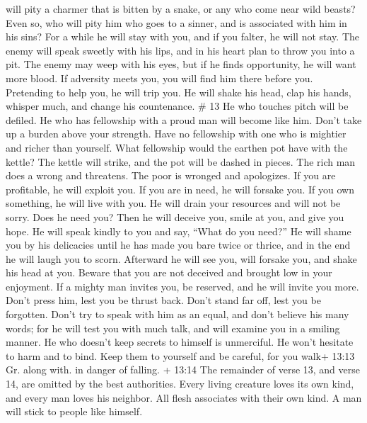 will pity a charmer that is bitten by a snake, or any who come near wild
beasts?  Even so, who will pity him who goes to a sinner,
and is associated with him in his sins?  For a while he
will stay with you, and if you falter, he will not stay. 
The enemy will speak sweetly with his lips, and in his heart plan to
throw you into a pit. The enemy may weep with his eyes, but if he finds
opportunity, he will want more blood.  If adversity meets
you, you will find him there before you. Pretending to help you, he will
trip you.  He will shake his head, clap his hands, whisper
much, and change his countenance. \# 13  He who touches
pitch will be defiled. He who has fellowship with a proud man will
become like him.  Don't take up a burden above your
strength. Have no fellowship with one who is mightier and richer than
yourself. What fellowship would the earthen pot have with the kettle?
The kettle will strike, and the pot will be dashed in pieces.
 The rich man does a wrong and threatens. The poor is
wronged and apologizes.  If you are profitable, he will
exploit you. If you are in need, he will forsake you.  If
you own something, he will live with you. He will drain your resources
and will not be sorry.  Does he need you? Then he will
deceive you, smile at you, and give you hope. He will speak kindly to
you and say, ``What do you need?''  He will shame you by his
delicacies until he has made you bare twice or thrice, and in the end he
will laugh you to scorn. Afterward he will see you, will forsake you,
and shake his head at you.  Beware that you are not deceived
and brought low in your enjoyment.  If a mighty man invites
you, be reserved, and he will invite you more.  Don't press
him, lest you be thrust back. Don't stand far off, lest you be
forgotten.  Don't try to speak with him as an equal, and
don't believe his many words; for he will test you with much talk, and
will examine you in a smiling manner.  He who doesn't keep
secrets to himself is unmerciful. He won't hesitate to harm and to bind.
 Keep them to yourself and be careful, for you walk+ 13:13
Gr. along with. in danger of falling.  + 13:14 The
remainder of verse 13, and verse 14, are omitted by the best
authorities.  Every living creature loves its own kind, and
every man loves his neighbor.  All flesh associates with
their own kind. A man will stick to people like himself. 
